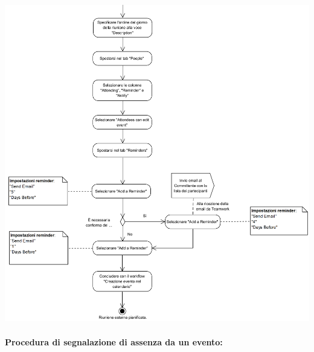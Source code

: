 \begin{center}
	\includegraphics[width=15cm]{./DiagrammiProcedure/RiunioneEsterna2.png}
\end{center}

\paragraph{Procedura di segnalazione di assenza da un evento:}

